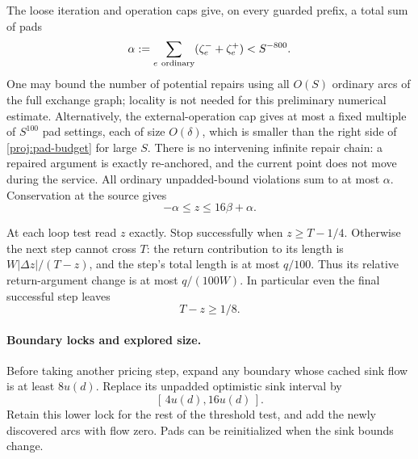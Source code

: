 The loose iteration and operation caps give, on every guarded
prefix, a total sum of pads
\begin{equation}
\label{proj:pad-budget}
             \alpha:=\sum_{e\ {\rm ordinary}}
                            (\zeta_e^-+\zeta_e^+)<S^{-800}.
\end{equation}
One may bound the number of potential repairs using all \(O(S)\)
ordinary arcs of the full exchange graph; locality is not needed
for this preliminary numerical estimate.  Alternatively, the
external-operation cap gives at most a fixed multiple of \(S^{100}\)
pad settings, each of size \(O(\delta)\), which is smaller than the
right side of \eqref{proj:pad-budget} for large \(S\).
There is no intervening infinite repair chain: a repaired argument
is exactly re-anchored, and the current point does not move during
the service.
All ordinary unpadded-bound violations sum to at most \(\alpha\).
Conservation at the source gives
\begin{equation}
\label{proj:return-range}
                     -\alpha\le z\le16\beta+\alpha .
\end{equation}

At each loop test read \(z\) exactly.  Stop successfully when
\(z\ge T-1/4\).  Otherwise the next step cannot cross \(T\):
the return contribution to its length is
\(W|\Delta z|/(T-z)\), and the step's total length is at most
\(q/100\).  Thus its relative return-argument change is at most
\(q/(100W)\).  In particular even the final successful step leaves
\begin{equation}
\label{proj:return-margin}
                              T-z\ge1/8 .
\end{equation}

\paragraph{Boundary locks and explored size.}
Before taking another pricing step, expand any boundary whose
cached sink flow is at least \(8u(d)\).  Replace its unpadded
optimistic sink interval by
\begin{equation}
\label{proj:lock}
                              [\,4u(d),16u(d)\,] .
\end{equation}
Retain this lower lock for the rest of the threshold test, and add
the newly discovered arcs with flow zero.  Pads can be
reinitialized when the sink bounds change.


